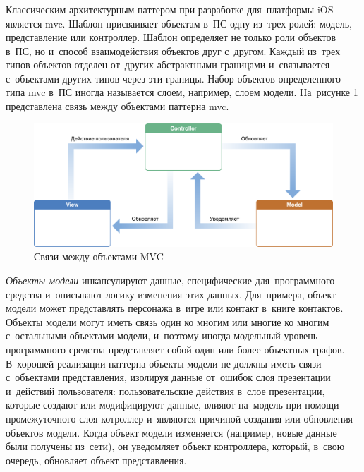 \subsubsection {}
\label{sec:analysis:research:mobArch:mvc}

Классическим архитектурным паттером при разработке для~платформы iOS является \gls{mvc}. Шаблон присваивает объектам в~ПС одну из~трех ролей: модель, представление или контроллер. Шаблон определяет не только роли объектов в~ПС, но и~способ взаимодействия объектов друг с~другом. Каждый из~трех типов объектов отделен от~других абстрактными границами и~связывается с~объектами других типов через эти границы. Набор объектов определенного типа \gls{mvc} в~ПС иногда называется слоем, например, слоем модели\cite{apple:mvc}. На~рисунке \ref{sec:analysis:research:mobArch:apple-mvc:image:mvc} представлена связь между объектами паттерна \gls{mvc}.

\begin{figure}[h]
  \centering
    \includegraphics[width=1\textwidth]{inc/img/mvc.png}
  \caption{Связи между объектами MVC}
  \label{sec:analysis:research:mobArch:apple-mvc:image:mvc}
\end{figure}

\emph{Объекты модели} инкапсулируют данные, специфические для~программного средства и~описывают логику изменения этих данных. Для~примера, объект модели может представлять персонажа в~игре или контакт в~книге контактов. Объекты модели могут иметь связь один ко многим или многие ко многим с~остальными объектами модели, и~поэтому иногда модельный уровень программного средства представляет собой один или более объектных графов. В~хорошей реализации паттерна объекты модели не должны иметь связи с~объектами представления, изолируя данные от~ошибок слоя презентации и~действий пользователя: пользовательские действия в~слое презентации, которые создают или модифицируют данные, влияют на~модель при помощи промежуточного слоя котроллер и~являются причиной создания или обновления объектов модели. Когда объект модели изменяется (например, новые данные были получены из~сети), он уведомляет объект контроллера, который, в~свою очередь, обновляет объект представления.

